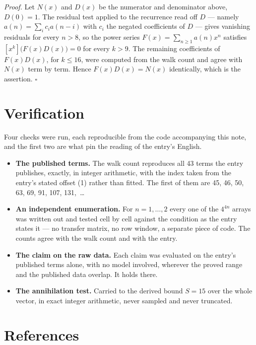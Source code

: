 \documentclass[11pt]{article}
\theoremstyle{definition}
\begin{document}
{\itshape Proof.} Let $N(x)$ and $D(x)$ be the numerator and denominator above, $D(0)=1$. The residual test applied to the recurrence read off $D$ --- namely $a(n) = \sum_i c_i a(n-i)$ with $c_i$ the negated coefficients of $D$ --- gives vanishing residuals for every $n > 8$, so the power series $F(x)=\sum_{n\ge 1}a(n)x^n$ satisfies $[x^k]\bigl(F(x)D(x)\bigr) = 0$ for every $k > 9$. The remaining coefficients of $F(x)D(x)$, for $k \le 16$, were computed from the walk count and agree with $N(x)$ term by term. Hence $F(x)D(x) = N(x)$ identically, which is the assertion. $\square$

\section{Verification}

Four checks were run, each reproducible from the code accompanying this note, and the first two are what pin the reading of the entry's English.

\begin{itemize}

\item {\bfseries The published terms.} The walk count reproduces all 43 terms the entry publishes, exactly, in integer arithmetic, with the index taken from the entry's stated offset (1) rather than fitted. The first of them are 45, 46, 50, 63, 69, 91, 107, 131,~\dots

\item {\bfseries An independent enumeration.} For $n = 1,\dots,2$ every one of the $4^{4n}$ arrays was written out and tested cell by cell against the condition as the entry states it --- no transfer matrix, no row window, a separate piece of code. The counts agree with the walk count and with the entry.

\item {\bfseries The claim on the raw data.} Each claim was evaluated on the entry's published terms alone, with no model involved, wherever the proved range and the published data overlap. It holds there.

\item {\bfseries The annihilation test.} Carried to the derived bound $S = 15$ over the whole vector, in exact integer arithmetic, never sampled and never truncated.

\end{itemize}

\section{References}
\end{document}
